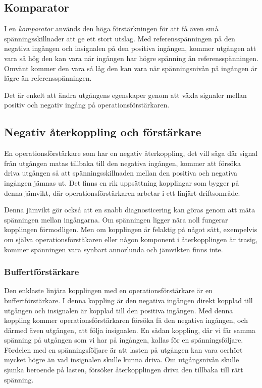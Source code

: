 \subsection{Komparator}

I en \emph{komparator} används den höga förstärkningen för att få även små
spänningsskillnader att ge ett stort utslag.
Med referensspänningen på den negativa ingången och insignalen på den positiva
ingången, kommer utgången att vara så hög den kan vara när ingången har högre
spänning än referensspänningen.
Omvänt kommer den vara så låg den kan vara när spänningsnivån på ingången är
lägre än referensspänningen.

Det är enkelt att ändra utgångens egenskaper genom att växla signaler mellan
positiv och negativ ingång på operationsförstärkaren.

\subsection{Negativ återkoppling och förstärkare}

En operationsförstärkare som har en negativ återkoppling, det vill säga där
signal från utgången matas tillbaka till den negativa ingången, kommer att
försöka driva utgången så att spänningsskillnaden mellan den positiva och
negativa ingången jämnas ut.
Det finns en rik uppsättning kopplingar som bygger på denna jämvikt, där
operationsförstärkaren arbetar i ett linjärt driftsområde.

Denna jämvikt gör också att en snabb diagnosticering kan göras genom att mäta
spänningen mellan ingångarna.
Om spänningen ligger nära noll fungerar kopplingen förmodligen.
Men om kopplingen är felaktig på något sätt, exempelvis om själva
operationsförstäkaren eller någon komponent i återkopplingen är trasig, kommer
spänningen vara synbart annorlunda och jämvikten finns inte.

\subsubsection{Buffertförstärkare}

Den enklaste linjära kopplingen med en operationsförstärkare är en
buffertförstärkare.
I denna koppling är den negativa ingången direkt kopplad till utgången och
insignalen är kopplad till den positiva ingången.
Med denna koppling kommer operationsförstärkaren försöka få den negativa
ingången, och därmed även utgången, att följa insignalen.
En sådan koppling, där vi får samma spänning på utgången som vi har på
ingången, kallas för en spänningsföljare.
Fördelen med en spänningsföljare är att lasten på utgången kan vara oerhört
mycket högre än vad insignalen skulle kunna driva.
Om utgångsnivån skulle sjunka beroende på lasten, försöker återkopplingen driva
den tillbaka till rätt spänning.

